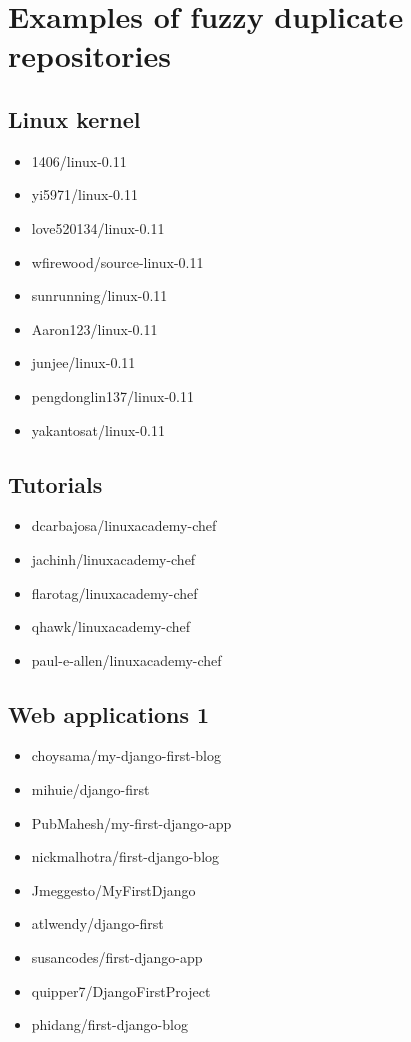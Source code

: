 \documentclass[conference,10pt]{IEEEtran}
\begin{document}
\section{Examples of fuzzy duplicate repositories} \label{fc_examples}
\subsection{Linux kernel}
\begin{itemize}
\item 1406/linux-0.11
\item yi5971/linux-0.11
\item love520134/linux-0.11
\item wfirewood/source-linux-0.11
\item sunrunning/linux-0.11
\item Aaron123/linux-0.11
\item junjee/linux-0.11
\item pengdonglin137/linux-0.11
\item yakantosat/linux-0.11
\end{itemize}
\subsection{Tutorials}
\begin{itemize}
\item dcarbajosa/linuxacademy-chef
\item jachinh/linuxacademy-chef
\item flarotag/linuxacademy-chef
\item qhawk/linuxacademy-chef
\item paul-e-allen/linuxacademy-chef
\end{itemize}
\subsection{Web applications 1}
\begin{itemize}
\item choysama/my-django-first-blog
\item mihuie/django-first
\item PubMahesh/my-first-django-app
\item nickmalhotra/first-django-blog
\item Jmeggesto/MyFirstDjango
\item atlwendy/django-first
\item susancodes/first-django-app
\item quipper7/DjangoFirstProject
\item phidang/first-django-blog
\end{itemize}
\end{document}

